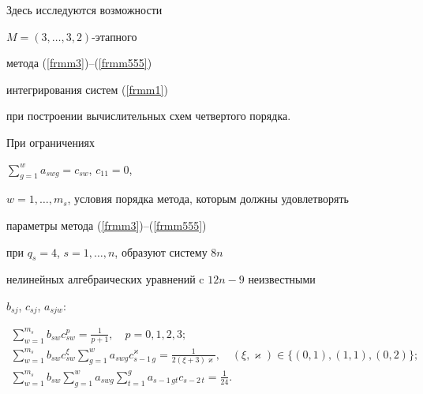 \smallskip





\noindent{}Здесь исследуются возможности


$M=(3,\dotsc,3,2)$-этапного


метода (\ref{frmm3})--(\ref{frmm555})


интегрирования систем (\ref{frmm1})


при построении вычислительных схем четвертого порядка.





При ограничениях


$\sum\limits_{g=1}^{w}a_{swg} =c_{sw}$, $c_{11} =0$,


$w=1,\dotsc,m_s$, условия порядка метода, которым должны удовлетворять


параметры метода (\ref{frmm3})--(\ref{frmm555})


при $q_s=4$, $s=1,\dotsc,n$, образуют систему $8n$


нелинейных алгебраических уравнений c $12n-9$ неизвестными


$b_{sj}$, $c_{sj}$, $a_{sjw}$:


\begin{gather}


\sum_{w=1}^{m_s}b_{sw} c_{sw} ^{p}


=\frac{\displaystyle 1}


{\displaystyle p+1},\quad p=0,1,2,3;


\label{frm0} \\


\sum_{w=1}^{m_s}b_{sw} c_{sw}^{\xi}


\sum_{g=1}^{w}a_{swg} c_{s-1\,g}^{\varkappa}


=\frac{\displaystyle 1}


{\displaystyle 2(\xi +3)\varkappa},


\quad (\xi,\varkappa)\in\{(0,1),(1,1),(0,2)\};


\label{frm30} \\


\sum_{w=1}^{m_s}b_{sw} \sum_{g=1}^{w}a_{swg}


\sum_{t=1}^{g}a_{s-1\,gt} c_{s-2\,t}


 =\frac{\displaystyle 1}


{\displaystyle 24}.


\label{frm32}


\end{gather}


